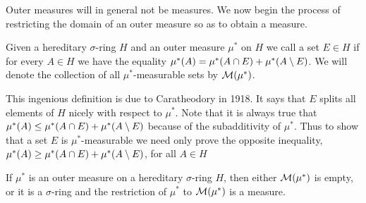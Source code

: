 Outer measures will in general not be measures. We now begin the process of restricting the domain of an outer measure so as to obtain a measure.

\begin{definition}
Given a hereditary $\sigma$-ring $H$ and an outer measure $\mu^*$ on $H$ we call a set $E\in H$  if for every $A\in H$ we have the equality $\mu^*(A)=\mu^*(A\cap E)+\mu^*(A\setminus E)$. We will denote the collection of all $\mu^*$-measurable sets by ${\cal M}(\mu^*)$.
\end{definition}

This ingenious definition is due to Caratheodory in 1918. It says that $E$ splits all elements of $H$ nicely with respect to $\mu^*$. Note that it is always true that $\mu^*(A)\leq\mu^*(A\cap E)+\mu^*(A\setminus E)$ because of the subadditivity of $\mu^*$. Thus to show that a set $E$ is $\mu^*$-measurable we need only prove the opposite inequality, $\mu^*(A)\geq\mu^*(A\cap E)+\mu^*(A\setminus E)$, for all $A\in H$

\begin{theorem}\label{thm:restriction of outer measure to meas sets}
If $\mu^*$ is an outer measure on a hereditary $\sigma$-ring $H$, then either ${\cal M}(\mu^*)$ is empty, or it is a $\sigma$-ring and the restriction of $\mu^*$ to ${\cal M}(\mu^*)$ is a measure.
\end{theorem}

